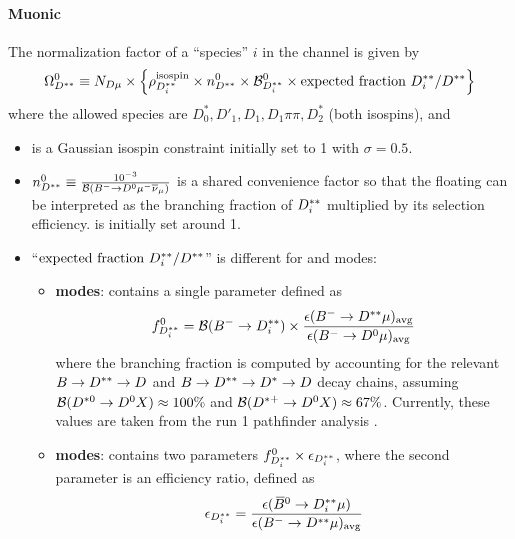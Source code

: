 \paragraph{Muonic}
The normalization factor of a \Dstst ``species'' $i$ in the \Dz channel is given
by
\begin{equation}
    \Omega_{D^{**}}^0 \equiv N_{D\mu} \times \left\{
        \rho_{D^{**}_i}^\text{isospin} \times n^{0}_{D^{**}} \times \mathcal{B}_{D^{**}_i}^{0} \times
        \text{expected fraction $D^{**}_i/D^{**}$}
    \right\}
    \label{eqn:dstst-yield-d0}
\end{equation}
where the allowed species are $D_0^*, D'_1, D_1, D_1\pi\pi, D_2^*$
(both isospins), and
\begin{itemize}
    \item \fitisoDi is a Gaussian isospin constraint initially set to 1
        with $\sigma = 0.5$.
    \item $n^{0}_{D^{**}} \equiv \frac{10^{-3}}{\mathcal{B}({{{B}^-}} \rightarrow {\ensuremath{{D}^0}}{\ensuremath{\mu^-}}{\ensuremath{{\overline{\nu}}_\mu}})}$
        is a shared convenience factor so that the floating \fitBFDDi can be
        interpreted as the branching fraction of $D^{**}_i$ multiplied by its
        selection efficiency.
        \fitBFDDi is initially set around 1.
    \item ``$\text{expected fraction $D^{**}_i/D^{**}$}$'' is different
        for \Bm and \Bzb modes:

    \begin{itemize}
        \item \textbf{\Bm modes}:
            contains a single parameter \fitfDDi defined as
            \begin{equation}
                f_{D^{**}_i}^{0} = \mathcal{B}({{{B}^-}} \rightarrow D^{**}_i) \times
                \frac{
                    \epsilon({{{B}^-}} \rightarrow D^{**}\mu)_\text{avg}
                }{
                    \epsilon({{{B}^-}} \rightarrow {\ensuremath{{D}^0}}\mu)_\text{avg}
                }
            \end{equation}
            where the branching fraction is computed by accounting for the
            relevant $B \rightarrow D^{**} \rightarrow D$ and
            $B \rightarrow D^{**} \rightarrow {\ensuremath{{D}^*}} \rightarrow D$ decay chains,
            assuming
            $\mathcal{B}({{D}^{*0}} \rightarrow {\ensuremath{{D}^0}} X) \approx 100\%$ and
            $\mathcal{B}({{D}^{*+}} \rightarrow {\ensuremath{{D}^0}} X) \approx 67\%$.
            Currently, these values are taken from the run 1 pathfinder analysis
            \cite{LHCb-ANA-2020-056}.

        \item \textbf{\Bzb modes}:
            contains two parameters $f_{D^{**}_i}^{0} \times \epsilon_{D^{**}_i}$,
            where the second parameter is an efficiency ratio, defined as
            \begin{equation}
                \epsilon_{D^{**}_i} =
                \frac{
                    \epsilon({{\kern 0.18em\overline{\kern -0.18em B}}{}^0} \rightarrow D^{**}_i\mu)
                }{
                    \epsilon({{{B}^-}} \rightarrow D^{**}\mu)_\text{avg}
                }
            \end{equation}
    \end{itemize}
\end{itemize}

